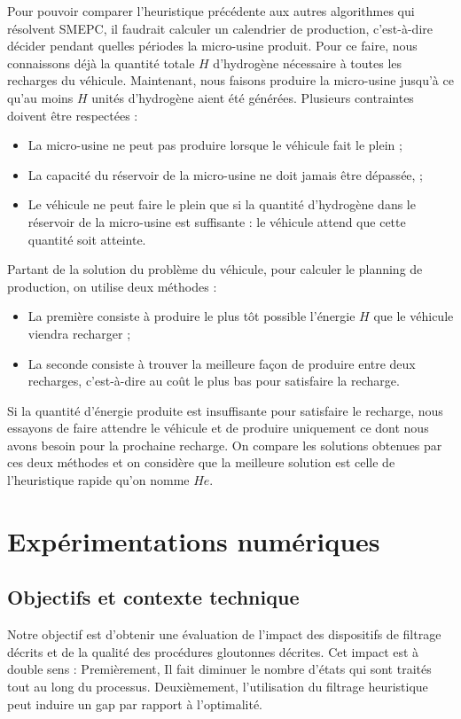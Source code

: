 Pour pouvoir comparer l'heuristique précédente aux autres algorithmes qui résolvent SMEPC, il faudrait  calculer un calendrier de production, c'est-à-dire décider pendant quelles périodes la micro-usine produit.
Pour ce faire, nous connaissons déjà la quantité totale $H$ d'hydrogène nécessaire à toutes les recharges du véhicule. Maintenant, nous faisons produire la micro-usine jusqu'à ce qu'au moins $H$ unités d'hydrogène aient été générées.
Plusieurs contraintes doivent être respectées :
\begin{itemize}[label=$\square$]
	\item La micro-usine ne peut pas produire lorsque le véhicule fait le plein ;
	\item La capacité du réservoir de la micro-usine ne doit jamais être dépassée, ;
	\item Le véhicule ne peut faire le plein que si la quantité d'hydrogène dans le réservoir de la micro-usine est suffisante : le véhicule attend que cette quantité soit atteinte.
\end{itemize}
Partant de la solution du problème du véhicule, pour calculer le planning de production, on utilise deux méthodes :
\begin{itemize}[label=$\square$]
	\item La première consiste à produire le plus tôt possible l'énergie $H$ que le véhicule viendra recharger ;
		\item La seconde consiste à trouver la meilleure façon de produire entre deux recharges, c'est-à-dire au coût le plus bas pour satisfaire la recharge. 
	\end{itemize}
Si la quantité d'énergie produite est insuffisante pour satisfaire le recharge, nous essayons de faire attendre le véhicule et de produire uniquement ce dont nous avons besoin pour la prochaine recharge.
On compare les solutions obtenues par ces deux méthodes et on considère que la meilleure solution est celle de l'heuristique rapide qu'on nomme $He$.
\section{Expérimentations numériques}
\label{Experimentations_num}
\subsection{Objectifs et contexte technique}

Notre objectif est d'obtenir une évaluation de l'impact des dispositifs de filtrage décrits et de la qualité des procédures gloutonnes décrites. Cet impact est à double sens : Premièrement, Il fait diminuer le nombre d'états qui sont traités tout au long du processus. Deuxièmement, l'utilisation du filtrage heuristique peut induire un gap par rapport à l'optimalité.

